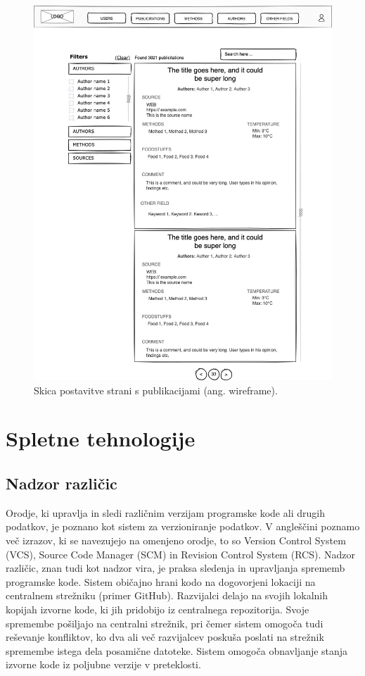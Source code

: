 \begin{figure}[h]
\begin{center}
\includegraphics[width=1\textwidth]{slike/wireframe.png}
\end{center}
\caption{ Skica postavitve strani s publikacijami (ang. wireframe). }
\label{wireframe}
\end{figure}

\clearpage

\section{Spletne tehnologije}
\subsection{Nadzor različic}
\label{version-control}
Orodje, ki upravlja in sledi različnim verzijam programske kode ali drugih podatkov, je poznano kot sistem za verzioniranje podatkov. V angleščini poznamo več izrazov, ki se navezujejo na omenjeno orodje, to so Version Control System (VCS), Source Code Manager (SCM) in Revision Control System (RCS). Nadzor različic, znan tudi kot nadzor vira, je praksa sledenja in upravljanja sprememb programske kode. Sistem običajno hrani kodo na dogovorjeni lokaciji na centralnem strežniku (primer GitHub). Razvijalci delajo na svojih lokalnih kopijah izvorne kode, ki jih pridobijo iz centralnega repozitorija. Svoje spremembe pošiljajo na centralni strežnik, pri čemer sistem omogoča tudi reševanje konfliktov, ko dva ali več razvijalcev poskuša poslati na strežnik spremembe istega dela posamične datoteke. Sistem omogoča obnavljanje stanja izvorne kode iz poljubne verzije v preteklosti.

